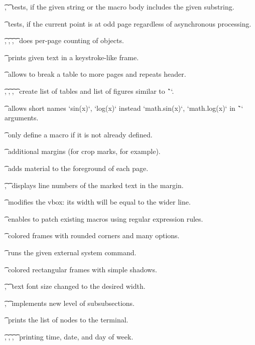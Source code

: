 {{\tpg[ismatch]\t\ismatch, \t\isinmacro\
tests, if the given string or the macro body includes the given substring.

\tpg[ispageodd]\t\ispageodd\
tests, if the current point is at odd page regardless of asynchronous processing.

\tpg[perpage]\t\incrpp, \t\thepp, \t\thepplast, \t\truepage\
does per-page counting of objects.

\tpg[keystrokes]\t\keystroke\
prints given text in a keystroke-like frame.

\tpg[longtable]\t\longtable\
allows to break a table to more pages and repeats header.

\tpg[lot]\t\makeLOF, \t\makeLOT, \t\captionF, \t\captionT\
create list of tables and list of figures similar to \^`\maketoc`.

\tpg[mathinexpr]\t\mathinexpr\ allows short names `sin(x)`, `log(x)`
instead `math.sin(x)`, `math.log(x)` in \~`\expr` arguments.

\tpg[onlyifnew]\t\onlyifnew\
only define a macro if it is not already defined.

\tpg[overlap]\t\overlap\
additional margins (for crop marks, for example).

\tpg[pgforeground]\t\pgforeground\
adds material to the foreground of each page.

\tpg[linnum]\t\pstart, \t\pend\
displays line numbers of the marked text in the margin.

\tpg[rebox]\t\rebox\
modifies the vbox: its width will be equal to the wider line.

\tpg[replmacro]\t\replmacro\
enables to patch existing macros using regular expression rules.

\tpg[roundframe]\t\roundframe\
colored frames with rounded corners and many options.

\tpg[runsystem]\t\runsystem\
runs the given external system command.

\tpg[shadedframe]\t\shadedframe\
colored rectangular frames with simple shadows.

\tpg[scaleto]\t\scaleto, \t\scaletof\
text font size changed to the desired width.

\tpg[seccc]\t\seccc, \t\iniseccc\
implements new level of subsubsections.

\tpg[shownodes]\t\shownodes\
prints the list of nodes to the terminal.

\tpg[dayw]\t\sethours, \t\setminutes, \t\setseconds, \t\setweekday\
printing time, date, and day of week.

}}
